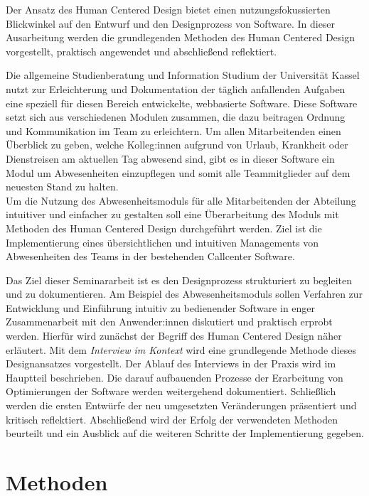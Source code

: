\documentclass[12pt]{article}
\begin{document}
Der Ansatz des Human Centered Design bietet einen nutzungsfokussierten
Blickwinkel auf den Entwurf und den Designprozess von Software. In dieser
Ausarbeitung werden die grundlegenden Methoden des Human Centered Design
vorgestellt, praktisch angewendet und abschließend reflektiert.

Die allgemeine Studienberatung und Information Studium der Universität Kassel
nutzt zur Erleichterung und Dokumentation der täglich anfallenden Aufgaben eine
speziell für diesen Bereich entwickelte, webbasierte Software. Diese Software
setzt sich aus verschiedenen Modulen zusammen, die dazu beitragen Ordnung und
Kommunikation im Team zu erleichtern. Um allen Mitarbeitenden einen Überblick
zu geben, welche Kolleg:innen aufgrund von Urlaub, Krankheit oder Dienstreisen
am aktuellen Tag abwesend sind, gibt es in dieser Software ein Modul um
Abwesenheiten einzupflegen und somit alle Teammitglieder auf dem neuesten Stand
zu halten.\\ Um die Nutzung des Abwesenheitsmoduls für alle Mitarbeitenden der
Abteilung intuitiver und einfacher zu gestalten soll eine Überarbeitung des
Moduls mit Methoden des Human Centered Design durchgeführt werden. Ziel ist die
Implementierung eines übersichtlichen und intuitiven Managements von
Abwesenheiten des Teams in der bestehenden Callcenter Software.

Das Ziel dieser Seminararbeit ist es den Designprozess strukturiert zu
begleiten und zu dokumentieren. Am Beispiel des Abwesenheitsmoduls sollen
Verfahren zur Entwicklung und Einführung intuitiv zu bedienender Software in
enger Zusammenarbeit mit den Anwender:innen diskutiert und praktisch erprobt
werden. Hierfür wird zunächst der Begriff des Human Centered Design näher
erläutert. Mit dem \textit{Interview im Kontext} wird eine grundlegende Methode
dieses Designansatzes vorgestellt. Der Ablauf des Interviews in der Praxis wird
im Hauptteil beschrieben. Die darauf aufbauenden Prozesse der Erarbeitung von
Optimierungen der Software werden weitergehend dokumentiert. Schließlich werden
die ersten Entwürfe der neu umgesetzten Veränderungen präsentiert und kritisch
reflektiert. Abschließend wird der Erfolg der verwendeten Methoden beurteilt
und ein Ausblick auf die weiteren Schritte der Implementierung gegeben.

\section{Methoden}
\end{document}
